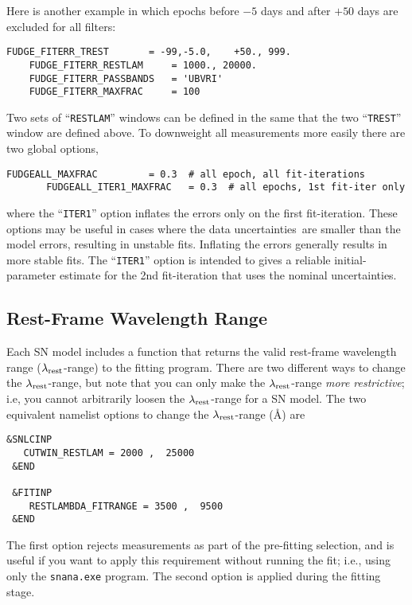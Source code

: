 \documentclass[12pt]{article}
\newcommand{\uncs}{uncertainties}
\newcommand{\lamrest}{\lambda_{\rm rest}}
\begin{document}
Here is another example in which epochs before $-5$ days 
and after $+50$ days are excluded for all filters:
%
\begin{Verbatim}[frame=single]
    FUDGE_FITERR_TREST       = -99,-5.0,    +50., 999.
    FUDGE_FITERR_RESTLAM     = 1000., 20000.
    FUDGE_FITERR_PASSBANDS   = 'UBVRI'
    FUDGE_FITERR_MAXFRAC     = 100 
\end{Verbatim}
%
Two sets of ``{\tt RESTLAM}'' windows can be defined
in the same that the two ``{\tt TREST}'' window are defined above.
To downweight all measurements more easily
there are two global options,
\begin{Verbatim}[frame=single]
       FUDGEALL_MAXFRAC         = 0.3  # all epoch, all fit-iterations
       FUDGEALL_ITER1_MAXFRAC   = 0.3  # all epochs, 1st fit-iter only
\end{Verbatim}
where the ``{\tt ITER1}'' option inflates the errors only on the 
first fit-iteration. These options may be useful in cases where 
the data \uncs\ are smaller than the model errors, resulting in 
unstable fits. Inflating the errors generally results in more 
stable fits. The ``{\tt ITER1}'' option is intended to 
gives a reliable initial-parameter estimate for the 2nd 
fit-iteration that uses the nominal \uncs.

   \subsection{Rest-Frame Wavelength Range}
   \label{subsec:restlambda}

Each SN model includes a function that returns the
valid rest-frame wavelength range ($\lamrest$-range)
to the fitting program.
There are two different ways to change the $\lamrest$-range,
but note that you can only make the $\lamrest$-range 
{\it more restrictive}; i.e, you cannot arbitrarily loosen the 
$\lamrest$-range for a SN model.
The two equivalent namelist options to change the 
$\lamrest$-range (\AA) are
%
\begin{Verbatim}[frame=single]
 &SNLCINP
   CUTWIN_RESTLAM = 2000 ,  25000
 &END

 &FITINP
    RESTLAMBDA_FITRANGE = 3500 ,  9500
 &END
\end{Verbatim}
%
The first option rejects measurements as part of the
pre-fitting selection, and is useful if you want to apply
this requirement without running the fit; i.e., using only
the {\tt snana.exe} program.  The second option is applied
during the fitting stage.
\end{document}
